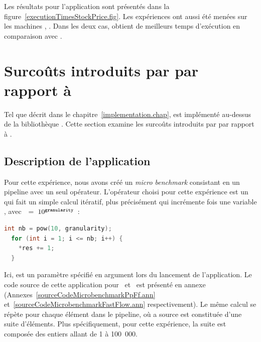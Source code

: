 
Les r\'esultats  pour l'application 
sont pr\'esent\'es dans la figure~\ref{executionTimesStockPrice.fig}. Les expériences ont aussi \'et\'e menées sur les machines , . Dans les deux cas,  obtient de meilleurs temps d'ex\'ecution en comparaison avec .



\section{Surco\^uts introduits par  par rapport \`a }
\label{coutsPpFf.sect}



Tel que d\'ecrit dans le chapitre~\ref{implementation.chap},  est impl\'ement\'e au-dessus de la biblioth\`eque . Cette section examine les surco\^uts introduits par  par rapport \`a . 

\subsection{Description de l'application}

Pour cette exp\'erience, nous avons cr\'e\'e un \emph{micro benchmark} consistant en un {pipeline} avec un seul op\'erateur. L'op\'erateur choisi pour cette exp\'erience est un  qui fait un simple calcul it\'eratif, plus pr\'ecis\'ement qui incr\'emente   fois une variable , avec~~=~$10^{{\tt granularity}}$~:
{
\begin{lstlisting}[language=c++]
  int nb = pow(10, granularity);
  for (int i = 1; i <= nb; i++) {
    *res += 1;   
  }
\end{lstlisting}
} 

Ici,  est un param\`etre sp\'ecifi\'e en argument lors du lancement de l'application. Le code source de cette application pour~ et~ est pr\'esent\'e en annexe (Annexes~\ref{sourceCodeMicrobenchmarkPpFf.ann} et~\ref{sourceCodeMicrobenchmarkFastFlow.ann} respectivement). Le m\^eme calcul se r\'ep\`ete pour chaque \'el\'ement dans le pipeline, o\`u a source est constitu\'ee d'une suite d'\'el\'ements. Plus sp\'ecifiquement, pour cette exp\'erience, la suite est compos\'ee des entiers allant de 1 \`a 100~000.  


